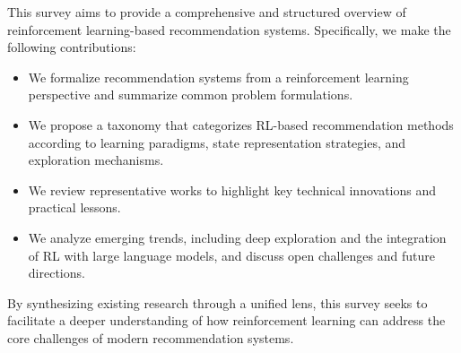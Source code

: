 This survey aims to provide a comprehensive and structured overview of reinforcement learning-based recommendation systems. Specifically, we make the following contributions:
\begin{itemize}
    \item We formalize recommendation systems from a reinforcement learning perspective and summarize common problem formulations.
    \item We propose a taxonomy that categorizes RL-based recommendation methods according to learning paradigms, state representation strategies, and exploration mechanisms.
    \item We review representative works to highlight key technical innovations and practical lessons.
    \item We analyze emerging trends, including deep exploration and the integration of RL with large language models, and discuss open challenges and future directions.
\end{itemize}

By synthesizing existing research through a unified lens, this survey seeks to facilitate a deeper understanding of how reinforcement learning can address the core challenges of modern recommendation systems.
\label{sec:intro}
